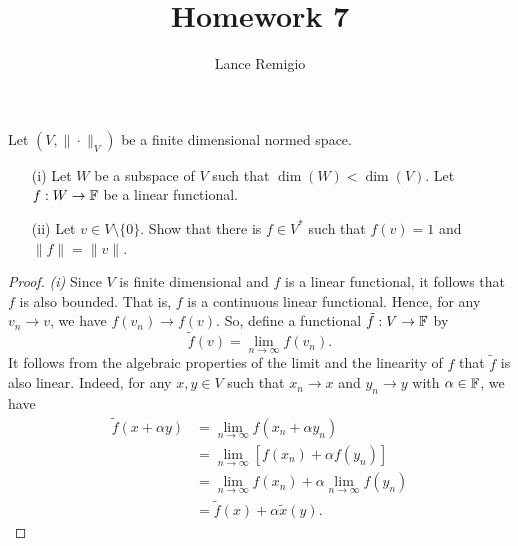 \documentclass[a4paper]{article}
\title{Homework 7}
\author{Lance Remigio}
\begin{document}
\maketitle

\begin{problem}
   Let \( (V, \|\cdot\|_V ) \) be a finite dimensional normed space.  
   \begin{enumerate}
       \item[(i)] Let \( W  \) be a subspace of \( V  \) such that \( \dim(W) < \dim(V) \). Let \( f: W \to \mathbb{F}  \) be a linear functional.
        \item[(ii)] Let \( v \in V \setminus  \{ 0  \}  \). Show that there is \( f \in V^{*} \) such that \( f(v) = 1  \) and \( \|f \| = \| v \| \).
   \end{enumerate}
\end{problem}
\begin{proof}
    \textit{(i)} Since \( V  \) is finite dimensional and \( f  \) is a linear functional, it follows that \( f  \) is also bounded. That is, \( f  \) is a continuous linear functional. Hence, for any \( {v}_{n} \to v  \), we have \( f({v}_{n}) \to f(v)  \). So, define a functional \( \tilde{f}: V \to \mathbb{F}  \) by
    \[  \tilde{f}(v) = \lim_{ n \to \infty  } f({v}_{n}). \]
    It follows from the algebraic properties of the limit and the linearity of \( f  \) that \( \tilde{f} \) is also linear. Indeed, for any \( x , y \in V  \) such that \( {x}_{n} \to x  \) and \( {y}_{n} \to y  \) with \( \alpha \in \mathbb{F}  \), we have 
    \begin{align*}
        \tilde{f}(x  + \alpha y ) &= \lim_{ n \to \infty  } f({x}_{n} + \alpha {y}_{n}) \\
                                  &= \lim_{ n \to \infty  } [ f({x}_{n}) + \alpha f({y}_{n}) ] \tag{\( f \) is linear}  \\
                                  &= \lim_{ n \to \infty  }  f({x}_{n}) + \alpha \lim_{ n \to \infty  }  f({y}_{n}) \tag{Algebraic Limit Theorem} \\
                                  &= \tilde{f}(x) + \alpha \tilde{x}(y).
    \end{align*}

      
\end{proof}
\end{document}
